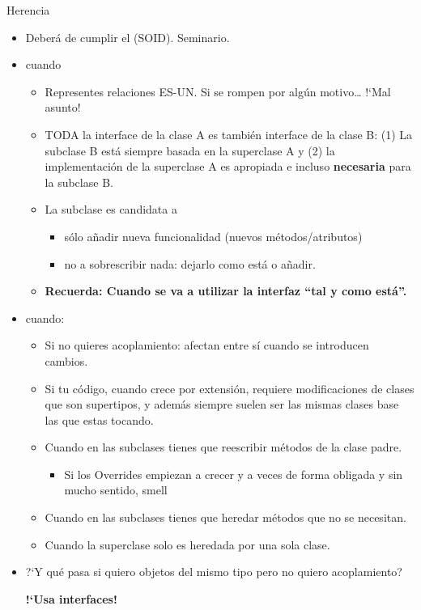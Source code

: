 \documentclass[10pt,envcountsect,spanish]{beamer}
\begin{document}
\begin{frame}{Herencia}
\begin{itemize}
\item Deberá de cumplir el  (SOID). Seminario.

\item  {} cuando
\begin{itemize}

\item Representes relaciones ES-UN. Si se rompen por algún motivo… !`Mal asunto!

\item TODA la interface de la clase A es también interface de la clase B: 
(1)  La subclase B está siempre  basada en la superclase A y (2)  {la implementación} de la superclase A es apropiada e incluso \textbf{necesaria} para la subclase B.

\item La subclase es candidata a 
\begin{itemize}
\item sólo añadir nueva funcionalidad (nuevos métodos/atributos)
\item no a sobrescribir nada: dejarlo como está o añadir.
\end{itemize}

\item \textbf{Recuerda: Cuando se va a utilizar la interfaz ``tal y como está''.}
\end{itemize}

\item {} cuando:
\begin{itemize}
\item Si no quieres acoplamiento: afectan entre sí cuando se introducen cambios.
\item Si tu código, cuando crece por extensión, requiere modificaciones de clases que son supertipos, y además siempre suelen ser las mismas clases base las que estas tocando.
\item Cuando en las subclases tienes que reescribir métodos de la clase padre.
	\begin{itemize}
	\item Si los Overrides empiezan a crecer y a veces de forma obligada y sin mucho sentido, smell
	\end{itemize}
\item Cuando en las subclases tienes que heredar métodos que no se necesitan.
\item Cuando la superclase solo es heredada por una sola clase.
\end{itemize}


\item ?`Y qué pasa si quiero objetos del mismo tipo pero no quiero acoplamiento? \\
\centerline{\textbf{!`Usa interfaces!}}
\end{itemize}
\end{frame}
\end{document}
